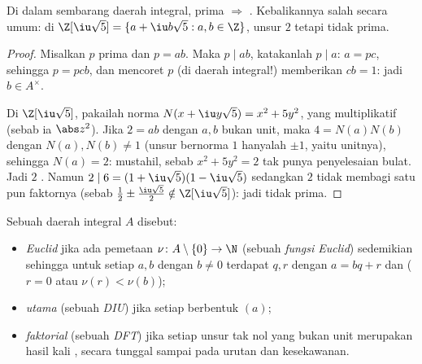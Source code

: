 \begin{proposition}\label{prop:b3:rings:primeirred}
Di dalam sembarang daerah integral, prima $\Rightarrow$ . Kebalikannya
salah secara umum: di $\Z[\iu\sqrt 5] = \{a + \iu b\sqrt5 : a, b
\in \Z\}$, unsur $2$  tetapi tidak prima.
\end{proposition}

\begin{proof}
Misalkan $p$ prima dan $p = ab$. Maka $p \mid ab$, katakanlah $p \mid a$:
$a = pc$, sehingga $p = pcb$, dan mencoret $p$ (di daerah integral!) memberikan $cb =
1$: jadi $b \in A^\times$.

Di $\Z[\iu\sqrt5]$, pakailah norma $N(x + \iu y\sqrt 5) = x^2 +
5y^2$, yang multiplikatif (sebab ia $\abs z^2$). Jika $2 = ab$
dengan $a, b$ bukan unit, maka $4 = N(a)N(b)$ dengan $N(a), N(b) \neq
1$ (unsur bernorma $1$ hanyalah $\pm1$, yaitu unitnya), sehingga $N(a) = 2$:
mustahil, sebab $x^2 + 5y^2 = 2$ tak punya penyelesaian bulat. Jadi $2$
. Namun $2 \mid 6 = (1 + \iu\sqrt5)(1 - \iu\sqrt5)$
sedangkan $2$ tidak membagi satu pun faktornya (sebab $\frac12 \pm \frac{\iu\sqrt5}2
\notin \Z[\iu\sqrt5]$): jadi tidak prima.
\end{proof}

\begin{definition}\label{def:b3:rings:pidufd}
Sebuah daerah integral $A$ disebut:
\begin{itemize}
  \item \emph{Euclid} jika ada pemetaan
        $\nu \colon A \setminus \{0\} \to \N$ (sebuah \emph{fungsi
        Euclid}) sedemikian sehingga untuk setiap $a, b$ dengan $b \ne 0$
        terdapat $q, r$ dengan $a = bq + r$ dan ($r = 0$ atau $\nu(r) <
        \nu(b)$);
  \item \emph{ utama} (sebuah \emph{DIU}) jika setiap  berbentuk $(a)$;
  \item \emph{faktorial} (sebuah \emph{DFT}) jika setiap unsur tak nol yang bukan unit merupakan hasil kali
        , secara tunggal sampai pada urutan dan kesekawanan.
\end{itemize}
\end{definition}

